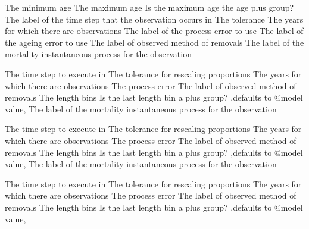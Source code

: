  {The minimum age}
 {The maximum age}
 {Is the maximum age the age plus group?}
 {The label of the time step that the observation occurs in}
 {The tolerance}
 {The years for which there are observations}
 {The label of the process error to use}
 {The label of the ageing error to use}
 {The label of observed method of removals}
 {The label of the mortality instantaneous process for the observation}
\par\textbf{}\par
{} {The time step to execute in}
 {The tolerance for rescaling proportions}
 {The years for which there are observations}
 {The process error}
 {The label of observed method of removals}
 {The length bins}
 {Is the last length bin a plus group? ,defaults to @model value,}
 {The label of the mortality instantaneous process for the observation}
\par\textbf{}\par
{} {The time step to execute in}
 {The tolerance for rescaling proportions}
 {The years for which there are observations}
 {The process error}
 {The label of observed method of removals}
 {The length bins}
 {Is the last length bin a plus group? ,defaults to @model value,}
 {The label of the mortality instantaneous process for the observation}
\par\textbf{}\par
{} {The time step to execute in}
 {The tolerance for rescaling proportions}
 {The years for which there are observations}
 {The process error}
 {The label of observed method of removals}
 {The length bins}
 {Is the last length bin a plus group? ,defaults to @model value,}
